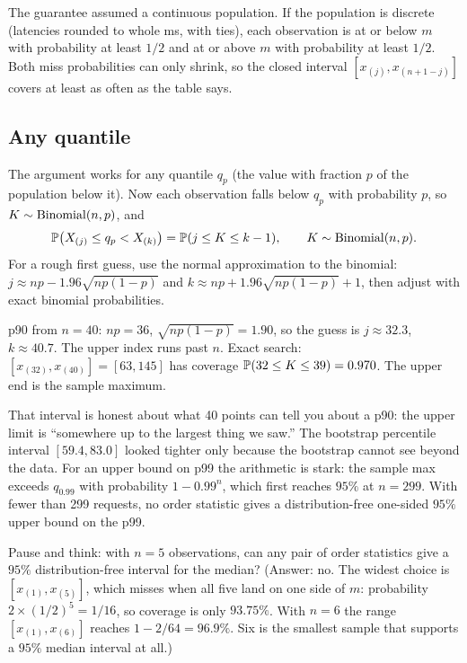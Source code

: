 The guarantee assumed a continuous population. If the population is discrete
(latencies rounded to whole ms, with ties), each observation is at or below $m$
with probability at least $1/2$ and at or above $m$ with probability at least
$1/2$. Both miss probabilities can only shrink, so the closed interval
$[x_{(j)}, x_{(n+1-j)}]$ covers at least as often as the table says.

\subsection{Any quantile}

The argument works for any quantile $q_p$ (the value with fraction $p$ of the
population below it). Now each observation falls below $q_p$ with probability
$p$, so $K \sim \Bin(n, p)$, and
\[
  \P\!\left( X_{(j)} \le q_p < X_{(k)} \right) = \P(j \le K \le k-1),
  \qquad K \sim \Bin(n,p).
\]
For a rough first guess, use the normal approximation to the binomial:
$j \approx np - 1.96\sqrt{np(1-p)}$ and $k \approx np + 1.96\sqrt{np(1-p)} + 1$,
then adjust with exact binomial probabilities.

\begin{walkbox}
p90 from $n=40$: $np = 36$, $\sqrt{np(1-p)} = 1.90$, so the guess is
$j \approx 32.3$, $k \approx 40.7$. The upper index runs past $n$. Exact search:
$[x_{(32)}, x_{(40)}] = [63, 145]$ has coverage
$\P(32 \le K \le 39) = 0.970$. The upper end is the sample maximum.
\end{walkbox}

That interval is honest about what 40 points can tell you about a p90: the
upper limit is ``somewhere up to the largest thing we saw.'' The bootstrap
percentile interval $[59.4, 83.0]$ looked tighter only because the bootstrap
cannot see beyond the data. For an upper bound on p99 the arithmetic is stark:
the sample max exceeds $q_{0.99}$ with probability $1 - 0.99^n$, which first
reaches $95\%$ at $n = 299$. With fewer than 299 requests, no order statistic
gives a distribution-free one-sided $95\%$ upper bound on the p99.

\begin{recoverybox}
Pause and think: with $n = 5$ observations, can any pair of order statistics
give a $95\%$ distribution-free interval for the median? (Answer: no. The widest
choice is $[x_{(1)}, x_{(5)}]$, which misses when all five land on one side of
$m$: probability $2 \times (1/2)^5 = 1/16$, so coverage is only $93.75\%$. With
$n = 6$ the range $[x_{(1)}, x_{(6)}]$ reaches $1 - 2/64 = 96.9\%$. Six is the
smallest sample that supports a $95\%$ median interval at all.)
\end{recoverybox}

